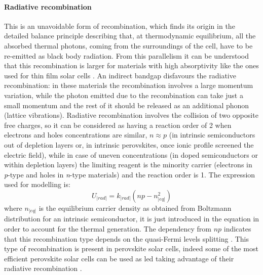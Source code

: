 		\paragraph{Radiative recombination}
		This is an unavoidable form of recombination, which finds its origin in the detailed balance principle describing that, at thermodynamic equilibrium, all the absorbed thermal photons, coming from the surroundings of the cell, have to be re-emitted as black body radiation.
		From this parallelism it can be understood that this recombination is larger for materials with high absorptivity \cite{Nelson2003} like the ones used for thin film solar cells \cite{Tvingstedt2015}.
		An indirect bandgap disfavours the radiative recombination: in these materials the recombination involves a large momentum variation, while the photon emitted due to the recombination can take just a small momentum and the rest of it should be released as an additional phonon (lattice vibrations).
		Radiative recombination involves the collision of two opposite free charges, so it can be considered as having a reaction order of 2 when electrons and holes concentrations are similar, $n \approx p$ (in intrinsic semiconductors out of depletion layers or, in intrinsic perovskites, once ionic profile screened the electric field), while in case of uneven concentrations (in doped semiconductors or within depletion layers) the limiting reagent is the minority carrier (electrons in \textit{p}-type and holes in \textit{n}-type materials) and the reaction order is 1.
		The expression used for modelling is:
		\begin{equation}
			U_|rad| = k_|rad| (np-n_|eq|^2)
		\end{equation}
		where $n_|eq|$ is the equilibrium carrier density as obtained from Boltzmann distribution for an intrinsic semiconductor, it is just introduced in the equation in order to account for the thermal generation.
		The dependency from $np$ indicates that this recombination type depends on the quasi\hyp{}Fermi levels splitting \cite{Stolterfoht2018a}.
		This type of recombination is present in perovskite solar cells, indeed some of the most efficient perovskite solar cells can be used as \gls{led} taking advantage of their radiative recombination \cite{Bi2016}.

